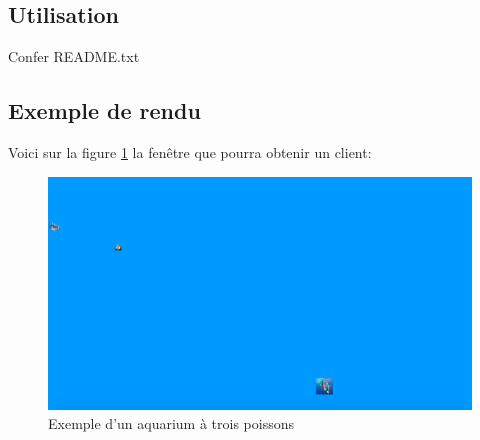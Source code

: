\subsection{Utilisation}

\indent Confer README.txt

\subsection{Exemple de rendu}

Voici sur la figure \ref{exempleAqua} la fenêtre que pourra obtenir un client:

\begin{figure}[!h]
\caption{\label{exempleAqua} Exemple d'un aquarium à trois poissons}
\begin{center}\includegraphics[scale=0.2]{Screenshot_Aqua}\end{center}
\end{figure}
